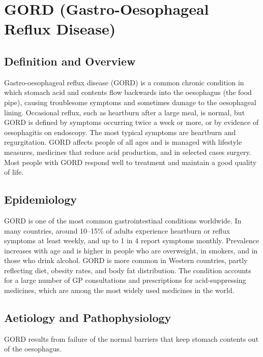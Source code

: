 \chapter{GORD (Gastro-Oesophageal Reflux Disease)}

\section*{Definition and Overview}
Gastro-oesophageal reflux disease (GORD) is a common chronic condition in which stomach acid and contents flow backwards into the oesophagus (the food pipe), causing troublesome symptoms and sometimes damage to the oesophageal lining. Occasional reflux, such as heartburn after a large meal, is normal, but GORD is defined by symptoms occurring twice a week or more, or by evidence of oesophagitis on endoscopy. The most typical symptoms are heartburn and regurgitation. GORD affects people of all ages and is managed with lifestyle measures, medicines that reduce acid production, and in selected cases surgery. Most people with GORD respond well to treatment and maintain a good quality of life.

\section*{Epidemiology}
GORD is one of the most common gastrointestinal conditions worldwide. In many countries, around 10--15\% of adults experience heartburn or reflux symptoms at least weekly, and up to 1 in 4 report symptoms monthly. Prevalence increases with age and is higher in people who are overweight, in smokers, and in those who drink alcohol. GORD is more common in Western countries, partly reflecting diet, obesity rates, and body fat distribution. The condition accounts for a large number of GP consultations and prescriptions for acid-suppressing medicines, which are among the most widely used medicines in the world.

\section*{Aetiology and Pathophysiology}
GORD results from failure of the normal barriers that keep stomach contents out of the oesophagus.


